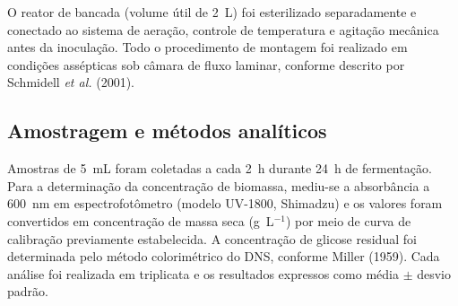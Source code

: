 O reator de bancada (volume útil de 2~L) foi esterilizado separadamente e conectado ao sistema de aeração, controle de temperatura e agitação mecânica antes da inoculação. Todo o procedimento de montagem foi realizado em condições assépticas sob câmara de fluxo laminar, conforme descrito por Schmidell \textit{et al.} (2001).

\subsection{Amostragem e métodos analíticos}

Amostras de 5~mL foram coletadas a cada 2~h durante 24~h de fermentação. Para a determinação da concentração de biomassa, mediu-se a absorbância a 600~nm em espectrofotômetro (modelo UV-1800, Shimadzu) e os valores foram convertidos em concentração de massa seca (g~L$^{-1}$) por meio de curva de calibração previamente estabelecida. A concentração de glicose residual foi determinada pelo método colorimétrico do DNS, conforme Miller (1959). Cada análise foi realizada em triplicata e os resultados expressos como média $\pm$ desvio padrão.

